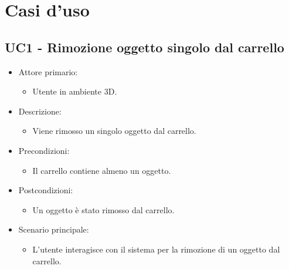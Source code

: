 \section{Casi d'uso}

\subsection{UC1 - Rimozione oggetto singolo dal carrello}

\begin{itemize}
	
	\item Attore primario: 
	\begin{itemize}
		\item Utente in ambiente 3D.
	\end{itemize}
	\item Descrizione:
	\begin{itemize}
		\item Viene rimosso un singolo oggetto dal carrello.
	\end{itemize}
	
	\item Precondizioni:
	\begin{itemize}
		\item Il carrello contiene almeno un oggetto.
	\end{itemize}
	
	\item Postcondizioni:
	\begin{itemize}
		\item Un oggetto è stato rimosso dal carrello.
	\end{itemize}
	
	\item Scenario principale:
	\begin{itemize}
		\item L'utente interagisce con il sistema per la rimozione di un oggetto dal carrello.
	\end{itemize}
	
\end{itemize}

\pagebreak

